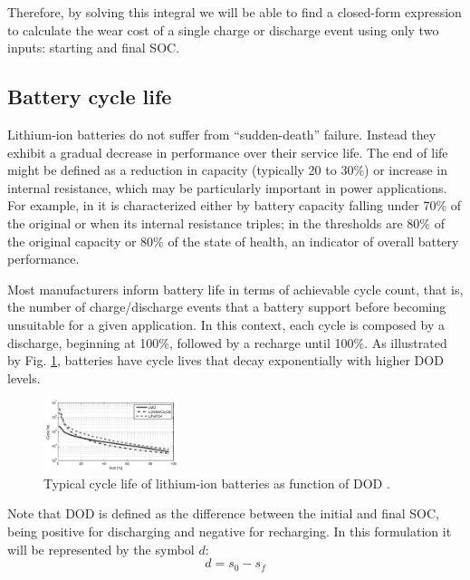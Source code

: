 \documentclass{ieeeaccess}
\begin{document}
    Therefore, by solving this integral we will be able to find a closed-form expression to calculate the wear cost of a single charge or discharge event using only two inputs: starting and final SOC.

    \subsection{Battery cycle life}
    Lithium-ion batteries do not suffer from ``sudden-death'' failure. Instead they exhibit a gradual decrease in performance over their service life. The end of life might be defined as a reduction in capacity (typically 20 to 30\%) or increase in internal resistance, which may be particularly important in power applications. For example, in \cite{ECKER2014} it is characterized either by battery capacity falling under 70\% of the original or when its internal resistance triples; in \cite{NARAYAN2018} the thresholds are 80\% of the original capacity or 80\% of the state of health, an indicator of overall battery performance.

    Most manufacturers inform battery life in terms of achievable cycle count, that is, the number of charge/discharge events that a battery support before becoming unsuitable for a given application. In this context, each cycle is composed by a discharge, beginning at 100\%, followed by a recharge until 100\%. As illustrated by Fig. \ref{fig:acc_curves1}, batteries have cycle lives that decay exponentially with higher DOD levels.

    \begin{figure}[htbp]
        \centering
        \includegraphics[width=0.35\textwidth]{figures/acc_curves1.png}
        \caption{Typical cycle life of lithium-ion batteries as function of DOD \cite{XU2016}.}
        \label{fig:acc_curves1}
    \end{figure}

    Note that DOD is defined as the difference between the initial and final SOC, being positive for discharging and negative for recharging. In this formulation it will be represented by the symbol $d$:
    \begin{equation}
        d = s_{0}-s_{f}
        \label{eq:dod(s)}
    \end{equation}
\end{document}
